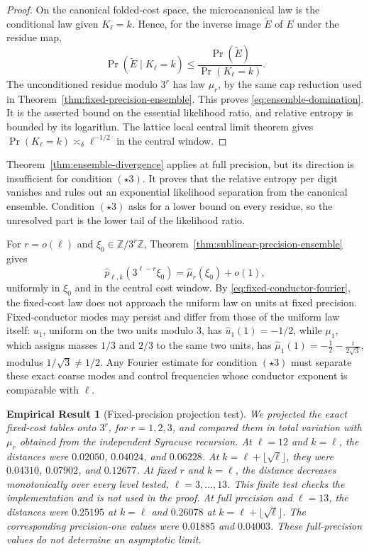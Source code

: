 \documentclass[11pt]{article}
\newtheorem{empirical}[theorem]{Empirical Result}
\theoremstyle{remark}
\begin{document}
\begin{proof}
On the canonical folded-cost space, the microcanonical law is the
conditional law given $K_\ell=k$. Hence, for the inverse image
$\widetilde E$ of $E$ under the residue map,
\[
 \Pr(\widetilde E\mid K_\ell=k)
 \le\frac{\Pr(\widetilde E)}{\Pr(K_\ell=k)}.
\]
The unconditioned residue modulo $3^r$ has law $\mu_r$, by the same cap
reduction used in Theorem~\ref{thm:fixed-precision-ensemble}. This proves
\eqref{eq:ensemble-domination}. It is the asserted bound on the
essential likelihood ratio, and relative entropy is bounded by its
logarithm. The lattice local central limit theorem gives
$\Pr(K_\ell=k)\asymp_\delta\ell^{-1/2}$ in the central window.
\end{proof}

Theorem~\ref{thm:ensemble-divergence} applies at full precision, but its
direction is insufficient for condition $(\star3)$. It proves that the
relative entropy per digit vanishes and rules out an exponential
likelihood separation from the canonical ensemble. Condition $(\star3)$
asks for a lower bound on every residue, so the unresolved part is the
lower tail of the likelihood ratio.

For $r=o(\ell)$ and $\xi_0\in\mathbb Z/3^r\mathbb Z$,
Theorem~\ref{thm:sublinear-precision-ensemble} gives
\begin{equation}\label{eq:fixed-conductor-fourier}
 \widehat p_{\ell,k}(3^{\ell-r}\xi_0)
 =\widehat\mu_r(\xi_0)+o(1),
\end{equation}
uniformly in $\xi_0$ and in the central cost window.
By \eqref{eq:fixed-conductor-fourier}, the fixed-cost law does not
approach the uniform law on units at
fixed precision. Fixed-conductor modes may persist and differ from
those of the uniform law itself: $u_1$, uniform on the two units
modulo $3$, has $\widehat u_1(1)=-1/2$, while $\mu_1$, which assigns
masses $1/3$ and $2/3$ to the same two units, has
$\widehat\mu_1(1)=-\tfrac12-\tfrac{i}{2\sqrt3}$, modulus $1/\sqrt3\ne1/2$.
Any Fourier estimate for condition
$(\star3)$ must separate these exact coarse modes and control frequencies
whose conductor exponent is comparable with $\ell$.

\begin{empirical}[Fixed-precision projection test]
\label{thm:fixed-precision-finite}
We projected the exact fixed-cost tables onto $3^r$, for $r=1,2,3$,
and compared them in total variation with $\mu_r$ obtained from the
independent Syracuse recursion. At $\ell=12$ and $k=\ell$, the
distances were $0.02050$, $0.04024$, and $0.06228$. At
$k=\ell+\lfloor\sqrt\ell\rfloor$, they were $0.04310$, $0.07902$,
and $0.12677$. At fixed $r$ and $k=\ell$, the distance decreases
monotonically over every level tested, $\ell=3,\ldots,13$. This
finite test checks the implementation and is not used in the proof.
At full precision and $\ell=13$, the distances were $0.25195$ at
$k=\ell$ and $0.26078$ at
$k=\ell+\lfloor\sqrt\ell\rfloor$. The corresponding precision-one
values were $0.01885$ and $0.04003$. These full-precision values do not
determine an asymptotic limit.
\end{empirical}
\end{document}
